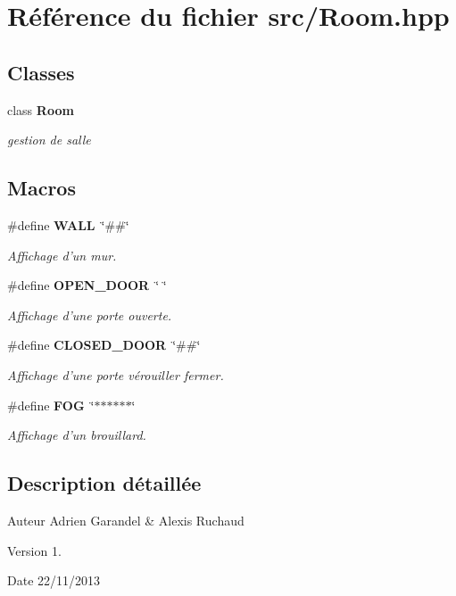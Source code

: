 \section{Référence du fichier src/\-Room.hpp}
\label{_room_8hpp}
\subsection*{Classes}
\begin{DoxyCompactItemize}
\item 
class {\bf Room}
\begin{DoxyCompactList}\small\item\em gestion de salle \end{DoxyCompactList}\end{DoxyCompactItemize}
\subsection*{Macros}
\begin{DoxyCompactItemize}
\item 
\#define {\bf W\-A\-L\-L}~\char`\"{}\#\#\char`\"{}
\begin{DoxyCompactList}\small\item\em Affichage d'un mur. \end{DoxyCompactList}\item 
\#define {\bf O\-P\-E\-N\-\_\-\-D\-O\-O\-R}~\char`\"{}  \char`\"{}
\begin{DoxyCompactList}\small\item\em Affichage d'une porte ouverte. \end{DoxyCompactList}\item 
\#define {\bf C\-L\-O\-S\-E\-D\-\_\-\-D\-O\-O\-R}~\char`\"{}\#\#\char`\"{}
\begin{DoxyCompactList}\small\item\em Affichage d'une porte vérouiller fermer. \end{DoxyCompactList}\item 
\#define {\bf F\-O\-G}~\char`\"{}$\ast$$\ast$$\ast$$\ast$$\ast$$\ast$\char`\"{}
\begin{DoxyCompactList}\small\item\em Affichage d'un brouillard. \end{DoxyCompactList}\end{DoxyCompactItemize}


\subsection{Description détaillée}
\begin{DoxyAuthor}{Auteur}
Adrien Garandel \& Alexis Ruchaud 
\end{DoxyAuthor}
\begin{DoxyVersion}{Version}
1. 
\end{DoxyVersion}
\begin{DoxyDate}{Date}
22/11/2013 
\end{DoxyDate}


